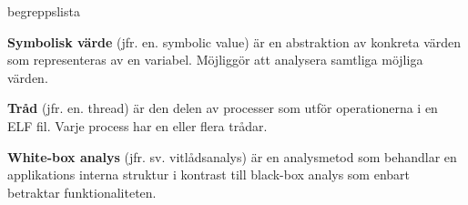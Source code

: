 \begin{labeling}{begreppslista}
    \item [\textbf{Symbolisk värde}] (jfr. en. symbolic value) är en abstraktion
    av konkreta värden som representeras av en variabel. Möjliggör att analysera
    samtliga möjliga värden.

    \item [\textbf{Tråd}] (jfr. en. thread) är den delen av processer som utför
    operationerna i en ELF fil. Varje process har en eller flera trådar.

    \item [\textbf{White-box analys}] (jfr. sv. vitlådsanalys) är en analysmetod
    som behandlar en applikations interna struktur i kontrast till black-box
    analys som enbart betraktar funktionaliteten.

\end{labeling}
